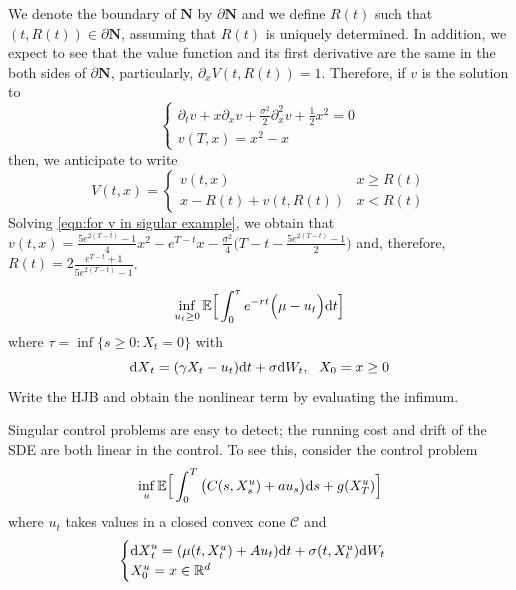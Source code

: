 \documentclass[11pt]{book}
\newcommand{\dt}{\text{\normalfont d}t}
\newcommand{\ds}{\text{\normalfont d}s}
\newcommand{\dX}{\text{\normalfont d}X}
\newcommand{\dW}{\text{\normalfont d}W}
\begin{document}
\begin{eg}
We denote the boundary of $\mathbf{N}$ by $\partial \mathbf{N}$ and we define $R(t)$ such that $(t,R(t))\in\partial\mathbf{N}$, assuming that $R(t)$ is uniquely determined.
In addition, we expect to see that the value function and its first derivative are the same in the both sides of $\partial \mathbf{N}$, particularly, $\partial_x V(t,R(t))=1$. Therefore, if $v$ is the solution to 
    \begin{equation}\label{eqn:for v in sigular example}
        \begin{cases}
            \partial_t v + x\partial_x v + \frac{\sigma^2}{2}\partial^2_{x} v + \frac12x^2 =0\\
            v(T,x)=x^2-x
        \end{cases}
    \end{equation}
    then, we anticipate to write 
    \begin{equation}
        V(t,x)=\begin{cases}
            v(t,x)& x\ge R(t)\\
            x-R(t)+v(t,R(t))& x< R(t)
        \end{cases}
    \end{equation}
Solving \eqref{eqn:for v in sigular example}, we obtain that $v(t,x)=\frac{5e^{2(T-t)}-1}{4}x^2-e^{T-t}x-\frac{\sigma^2}{4}\Big(T-t-\frac{5e^{2(T-t)}-1}{2}\Big)$ and, therefore, $R(t)=2\frac{e^{T-t}+1}{5e^{2(T-t)}-1}$. 
\end{eg}
\begin{ex}\label{ex:DS}
    \begin{equation}
        \inf_{u_t\ge0}\mathbb{E}\Big[\int_0^\tau e^{-r t} \Big(\mu - u_t\Big){\dt}\Big]
    \end{equation}
    where $\tau=\inf\{s\ge0: X_t=0\}$ with
    \begin{equation}
        {\dX}_t=(\gamma X_t-u_t){{\dt}}+\sigma \dW_t, ~~ X_0=x\ge0
    \end{equation}
    Write the HJB and obtain the nonlinear term by evaluating the infimum. 
\end{ex}
Singular control problems are easy to detect; the running cost and drift of the SDE are both linear in the control. To see this, consider the control problem
\begin{equation}\label{eqn:dpp_singular}
        \inf_{u}\mathbb{E}\Big[\int_0^T \big(C(s,X^u_s)+au_s\big){{\ds}} + g(X_T^u)\Big]
    \end{equation}
where $u_t$ takes values in a closed convex cone $\mathcal{C}$ and 
\begin{equation}
	\begin{cases}
	    {\dX}^u_t =(\mu(t,X_t^u)+Au_t){{\dt}}+\sigma(t,X_t^u)\dW_t\\
     X^u_0=x\in\mathbb{R}^d
	\end{cases}
\end{equation}
\end{document}
